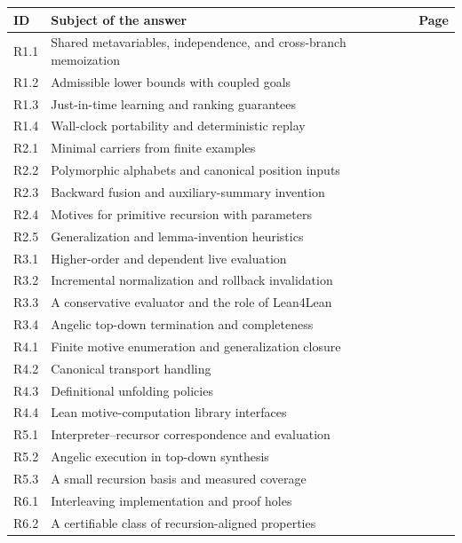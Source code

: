 \documentclass[11pt,a4paper]{article}
\theoremstyle{remark}
\begin{document}
\begin{longtable}{@{}L{15mm}L{121mm}r@{}}
\toprule
ID & Subject of the answer & Page\\
\midrule
\endhead
R1.1 & Shared metavariables, independence, and cross-branch memoization & \pageref{q:R1.1}\\
R1.2 & Admissible lower bounds with coupled goals & \pageref{q:R1.2}\\
R1.3 & Just-in-time learning and ranking guarantees & \pageref{q:R1.3}\\
R1.4 & Wall-clock portability and deterministic replay & \pageref{q:R1.4}\\
R2.1 & Minimal carriers from finite examples & \pageref{q:R2.1}\\
R2.2 & Polymorphic alphabets and canonical position inputs & \pageref{q:R2.2}\\
R2.3 & Backward fusion and auxiliary-summary invention & \pageref{q:R2.3}\\
R2.4 & Motives for primitive recursion with parameters & \pageref{q:R2.4}\\
R2.5 & Generalization and lemma-invention heuristics & \pageref{q:R2.5}\\
R3.1 & Higher-order and dependent live evaluation & \pageref{q:R3.1}\\
R3.2 & Incremental normalization and rollback invalidation & \pageref{q:R3.2}\\
R3.3 & A conservative evaluator and the role of Lean4Lean & \pageref{q:R3.3}\\
R3.4 & Angelic top-down termination and completeness & \pageref{q:R3.4}\\
R4.1 & Finite motive enumeration and generalization closure & \pageref{q:R4.1}\\
R4.2 & Canonical transport handling & \pageref{q:R4.2}\\
R4.3 & Definitional unfolding policies & \pageref{q:R4.3}\\
R4.4 & Lean motive-computation library interfaces & \pageref{q:R4.4}\\
R5.1 & Interpreter--recursor correspondence and evaluation & \pageref{q:R5.1}\\
R5.2 & Angelic execution in top-down synthesis & \pageref{q:R5.2}\\
R5.3 & A small recursion basis and measured coverage & \pageref{q:R5.3}\\
R6.1 & Interleaving implementation and proof holes & \pageref{q:R6.1}\\
R6.2 & A certifiable class of recursion-aligned properties & \pageref{q:R6.2}\\

\end{longtable}
\end{document}

